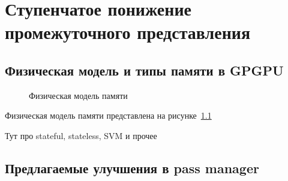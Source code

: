\chapter{Ступенчатое понижение промежуточного представления}\label{ch:lowering}

\section{Физическая модель и типы памяти в GPGPU}\label{sec:lowering/physical}

\begin{figure}[ht]
    \caption{Физическая модель памяти}\label{fig:memory-scheme}
\end{figure}

Физическая модель памяти представлена на рисунке~\cref{fig:memory-scheme}

Тут про stateful, stateless, SVM и прочее

\section{Предлагаемые улучшения в pass manager}\label{sec:lowering/passes}

